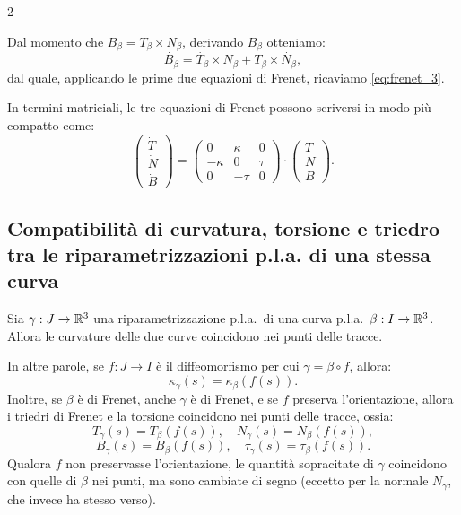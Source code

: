 \begin{multicols*}{2}
    \begin{remark}
        Dal momento che $B_\beta = T_\beta \times N_\beta$, derivando
        $B_\beta$ otteniamo:
        \[ \dot{B_\beta} = \dot{T_\beta} \times N_\beta + T_\beta \times \dot{N_\beta}, \]
        dal quale, applicando le prime due equazioni di Frenet, ricaviamo \eqref{eq:frenet_3}.
    \end{remark}

    \begin{remark}
        In termini matriciali, le tre equazioni di Frenet possono scriversi
        in modo più compatto come:
        \[
            \begin{pmatrix}
                \dot{T} \\
                \dot{N} \\
                \dot{B}
            \end{pmatrix} =
            \begin{pmatrix}
                0       & \kappa & 0    \\
                -\kappa & 0      & \tau \\
                0       & -\tau  & 0
            \end{pmatrix} \cdot
            \begin{pmatrix}
                T \\
                N \\
                B
            \end{pmatrix}.
        \]
    \end{remark}

    \subsection{Compatibilità di curvatura, torsione e triedro tra le riparametrizzazioni p.l.a. di una stessa curva}

    \begin{proposition} \label{prop:compatibilità_riparametrizzazioni_pla}
        Sia $\gamma : J \to \mathbb{R}^3$ una riparametrizzazione p.l.a.~di una curva p.l.a.~$\beta : I \to \mathbb{R}^3$.
        Allora le curvature delle due curve coincidono nei
        punti delle tracce. \medskip

        In altre parole, se $f : J \to I$ è il diffeomorfismo per cui
        $\gamma = \beta \circ f$, allora:
        \[
            \kappa_\gamma(s) = \kappa_\beta(f(s)).
        \]
        Inoltre, se $\beta$ è di Frenet, anche $\gamma$ è di Frenet, e se $f$ preserva l'orientazione,
        allora i triedri di Frenet e la torsione coincidono nei punti delle tracce, ossia:
        \[
            T_\gamma(s) = T_\beta(f(s)), \quad N_\gamma(s) = N_\beta(f(s)),
        \]
        \[
            B_\gamma(s) = B_\beta(f(s)), \quad \tau_\gamma(s) = \tau_\beta(f(s)).
        \]
        Qualora $f$ non preservasse l'orientazione, le quantità sopracitate di $\gamma$
        coincidono con quelle di $\beta$ nei punti, ma sono cambiate di segno (eccetto per la normale
        $N_\gamma$, che invece ha stesso verso).
    \end{proposition}


\end{multicols*}
